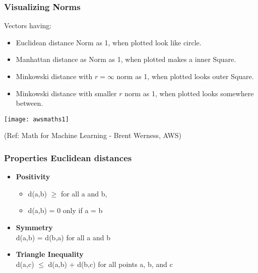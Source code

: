 \begin{frame}[fragile] \frametitle{Visualizing Norms}


Vectors having:

	\begin{itemize}
		\item Euclidean distance Norm as 1, when plotted look like circle.
		\item Manhattan distance as Norm as 1, when plotted makes a inner Square.
		\item Minkowski distance with $r=\infty$ norm as 1, when plotted looks outer Square.
				\item Minkowski distance with smaller $r$ norm as 1, when plotted looks somewhere between.
\end{itemize}

\begin{center}
\texttt{[image: awsmaths1]}
\end{center}

{\tiny (Ref: Math for Machine Learning - Brent Werness, AWS)}

\end{frame}


\begin{frame}[fragile]\frametitle{Properties Euclidean distances}

		\begin{itemize}
			\item {\bf Positivity}
			\begin{itemize}
				\item d(a,b) $\geq$ for all a and b,
				\item d(a,b) = 0 only if a = b
			\end{itemize}
			\item {\bf Symmetry} \\
				d(a,b) = d(b,a) for all a and b
			\item {\bf Triangle Inequality} \\
				d(a,c) $\leq$ d(a,b) + d(b,c) for all points a, b, and c
\end{itemize}
\end{frame}


